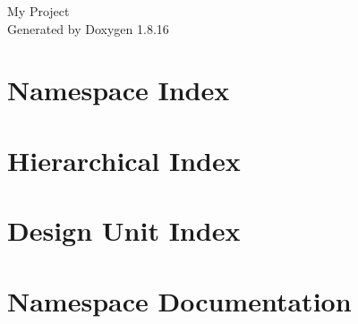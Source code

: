 \let\mypdfximage\pdfximage\def\pdfximage{\immediate\mypdfximage}\documentclass[twoside]{book}
\newcommand{\+}{\discretionary{\mbox{\scriptsize$\hookleftarrow$}}{}{}}
\newcommand{\clearemptydoublepage}{%
  \newpage{\pagestyle{empty}\cleardoublepage}%
}
\begin{document}
\hypersetup{pageanchor=false,
             bookmarksnumbered=true,
             pdfencoding=unicode
            }
\begin{titlepage}
\vspace*{7cm}
\begin{center}%
{\Large My Project }\\
\vspace*{1cm}
{\large Generated by Doxygen 1.8.16}\\
\end{center}
\end{titlepage}
\clearemptydoublepage
{}
\tableofcontents
\clearemptydoublepage
{}
\hypersetup{pageanchor=true}

\chapter{Namespace Index}

\chapter{Hierarchical Index}

\chapter{Design Unit Index}

\chapter{Namespace Documentation}





\end{document}

